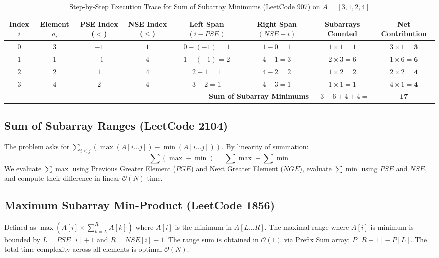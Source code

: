 \documentclass[10pt,journal,compsoc,onecolumn]{IEEEtran}
\begin{document}
\begin{table}[htbp]
\caption{Step-by-Step Execution Trace for Sum of Subarray Minimums (LeetCode 907) on $A = [3, 1, 2, 4]$}
\label{tab:trace_lc907}
\centering
\begin{tabular}{cccccccc}
\toprule
\textbf{Index $i$} & \textbf{Element $a_i$} & \textbf{PSE Index ($<$)} & \textbf{NSE Index ($\le$)} & \textbf{Left Span $(i - PSE)$} & \textbf{Right Span $(NSE - i)$} & \textbf{Subarrays Counted} & \textbf{Net Contribution} \\
\midrule
$0$ & $3$ & $-1$ & $1$ & $0 - (-1) = 1$ & $1 - 0 = 1$ & $1 \times 1 = 1$ & $3 \times 1 = \mathbf{3}$ \\
$1$ & $1$ & $-1$ & $4$ & $1 - (-1) = 2$ & $4 - 1 = 3$ & $2 \times 3 = 6$ & $1 \times 6 = \mathbf{6}$ \\
$2$ & $2$ & $1$ & $4$ & $2 - 1 = 1$ & $4 - 2 = 2$ & $1 \times 2 = 2$ & $2 \times 2 = \mathbf{4}$ \\
$3$ & $4$ & $2$ & $4$ & $3 - 2 = 1$ & $4 - 3 = 1$ & $1 \times 1 = 1$ & $4 \times 1 = \mathbf{4}$ \\
\midrule
\multicolumn{7}{r}{\textbf{Sum of Subarray Minimums = $3 + 6 + 4 + 4 = $}} & $\mathbf{17}$ \\
\bottomrule
\end{tabular}
\end{table}

\subsection{Sum of Subarray Ranges (LeetCode 2104)}
The problem asks for $\sum_{i \le j} (\max(A[i \dots j]) - \min(A[i \dots j]))$.
By linearity of summation:
\begin{equation}
\sum (\max - \min) = \sum \max - \sum \min
\end{equation}
We evaluate $\sum \max$ using Previous Greater Element ($PGE$) and Next Greater Element ($NGE$), evaluate $\sum \min$ using $PSE$ and $NSE$, and compute their difference in linear $\mathcal{O}(N)$ time.

\subsection{Maximum Subarray Min-Product (LeetCode 1856)}
Defined as $\max(A[i] \times \sum_{k=L}^R A[k])$ where $A[i]$ is the minimum in $A[L \dots R]$.
The maximal range where $A[i]$ is minimum is bounded by $L = PSE[i] + 1$ and $R = NSE[i] - 1$.
The range sum is obtained in $\mathcal{O}(1)$ via Prefix Sum array: $P[R + 1] - P[L]$.
The total time complexity across all elements is optimal $\mathcal{O}(N)$.
\end{document}
